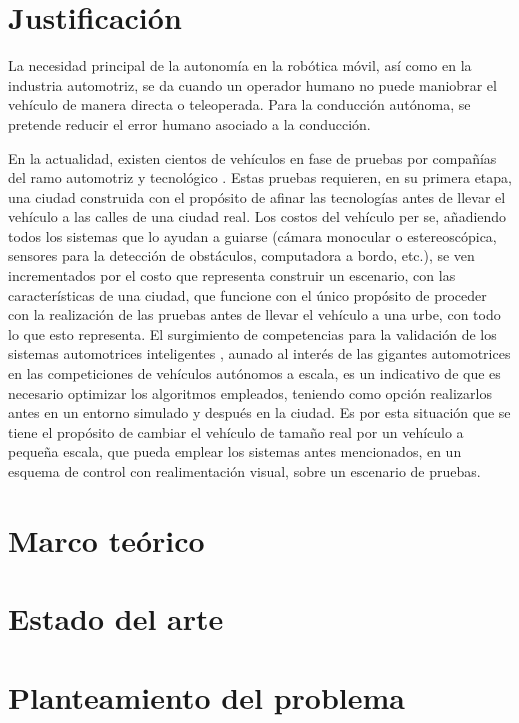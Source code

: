 \documentclass[12pt, letterpaper, oneside]{book}
\begin{document}
	\chapter*{Justificación}
	\label{cap:jus}
	La necesidad principal de la autonomía en la robótica móvil, así como en la industria automotriz, se da cuando un operador humano no puede maniobrar el vehículo de manera directa o teleoperada. Para la conducción autónoma, se pretende reducir el error humano asociado a la conducción.
	\par En la actualidad, existen cientos de vehículos en fase de pruebas por compañías del ramo automotriz y tecnológico \cite{Autopilot, LookingFurther, WaymoWaymo}. Estas pruebas requieren, en su primera etapa, una ciudad construida con el propósito de afinar las tecnologías antes de llevar el vehículo a las calles de una ciudad real. Los costos del vehículo per se, añadiendo todos los sistemas que lo ayudan a guiarse (cámara monocular o estereoscópica, sensores para la detección de obstáculos, computadora a bordo, etc.), se ven incrementados por el costo que representa construir un escenario, con las características de una ciudad, que funcione con el único propósito de proceder con la realización de las pruebas antes de llevar el vehículo a una urbe, con todo lo que esto representa. El surgimiento de competencias para la validación de los sistemas automotrices inteligentes \cite{GrandChallengeAutonomous}, aunado al interés de las gigantes automotrices en las competiciones de vehículos autónomos a escala, es un indicativo de que es necesario optimizar los algoritmos empleados, teniendo como opción realizarlos antes en un entorno simulado y después en la ciudad. Es por esta situación que se tiene el propósito de cambiar el vehículo de tamaño real por un vehículo a pequeña escala, que pueda emplear los sistemas antes mencionados, en un esquema de control con realimentación visual, sobre un escenario de pruebas.
	\chapter{Marco teórico}
	\label{cap:mt}
	
	\chapter{Estado del arte}
	\label{cap:eda}
	
	\chapter{Planteamiento del problema}
	\label{cap:pdp}
	
\end{document}
